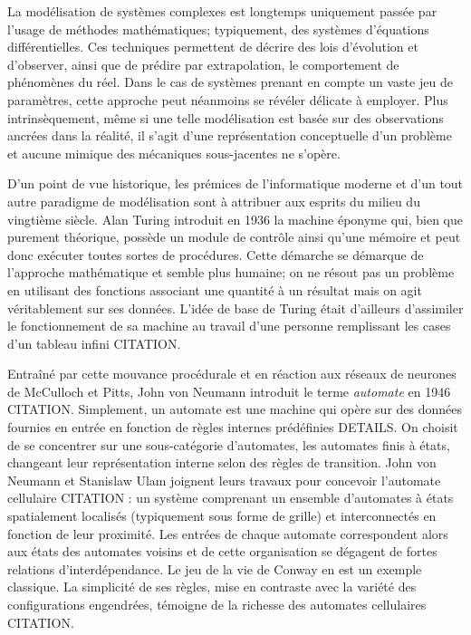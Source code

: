 \documentclass[10pt]{article}
\begin{document}
La modélisation de systèmes complexes est longtemps uniquement passée
par l'usage de méthodes mathématiques; typiquement, des systèmes
d'équations différentielles. Ces techniques permettent de décrire des
lois d'évolution et d'observer, ainsi que de prédire par
extrapolation, le comportement de phénomènes du réel. Dans le cas de
systèmes prenant en compte un vaste jeu de paramètres, cette approche
peut néanmoins se révéler délicate à employer. Plus intrinsèquement,
même si une telle modélisation est basée sur des observations ancrées
dans la réalité, il s'agit d'une représentation conceptuelle d'un
problème et aucune mimique des mécaniques sous-jacentes ne s'opère.

D'un point de vue historique, les prémices de l'informatique moderne
et d'un tout autre paradigme de modélisation sont à attribuer aux
esprits du milieu du vingtième siècle. Alan Turing introduit en 1936
la machine éponyme qui, bien que purement théorique, possède un module
de contrôle ainsi qu'une mémoire et peut donc exécuter toutes sortes
de procédures. Cette démarche se démarque de l'approche mathématique
et semble plus humaine; on ne résout pas un problème en utilisant des
fonctions associant une quantité à un résultat mais on agit
véritablement sur ses données. L'idée de base de Turing était
d'ailleurs d'assimiler le fonctionnement de sa machine au travail
d'une personne remplissant les cases d'un tableau infini CITATION.

Entraîné par cette mouvance procédurale et en réaction aux réseaux de
neurones de McCulloch et Pitts, John von Neumann introduit le terme
\textit{automate} en 1946 CITATION. Simplement, un automate est une
machine qui opère sur des données fournies en entrée en fonction de
règles internes prédéfinies DETAILS. On choisit de se concentrer sur
une sous-catégorie d'automates, les automates finis à états, changeant
leur représentation interne selon des règles de transition. John von
Neumann et Stanislaw Ulam joignent leurs travaux pour concevoir
l'automate cellulaire CITATION : un système comprenant un ensemble
d'automates à états spatialement localisés (typiquement sous forme de
grille) et interconnectés en fonction de leur proximité. Les entrées
de chaque automate correspondent alors aux états des automates voisins
et de cette organisation se dégagent de fortes relations
d'interdépendance. Le jeu de la vie de Conway en est un exemple
classique. La simplicité de ses règles, mise en contraste avec la
variété des configurations engendrées, témoigne de la richesse des
automates cellulaires CITATION.
\end{document}
